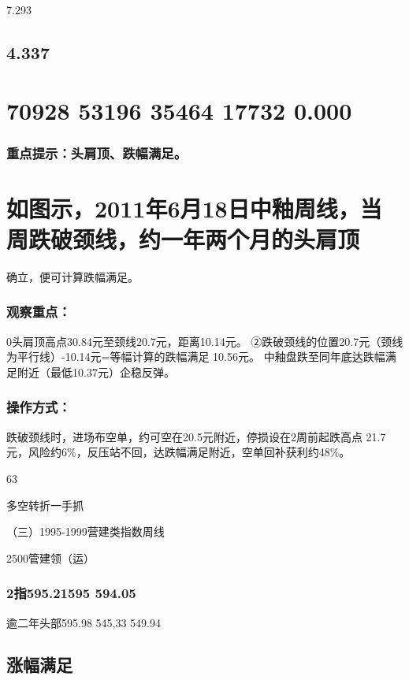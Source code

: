 \documentclass{article}
\begin{document}
7.293

\subsection{4.337}

\section{70928 53196 35464 17732 0.000}

\subsubsection{重点提示：头肩顶、跌幅满足。}

\section{如图示，2011年6月18日中釉周线，当周跌破颈线，约一年两个月的头肩顶}

确立，便可计算跌幅满足。

\subsubsection{观察重点：}

0头肩顶高点30.84元至颈线20.7元，距离10.14元。 ②跌破颈线的位置20.7元（颈线为平行线）-10.14元=等幅计算的跌幅满足 10.56元。 中釉盘跌至同年底达跌幅满足附近（最低10.37元）企稳反弹。

\subsubsection{操作方式：}

跌破颈线时，进场布空单，约可空在20.5元附近，停损设在2周前起跌高点 21.7元，风险约6\%，反压站不回，达跌幅满足附近，空单回补获利约48\%。

63

\clearpage

多空转折一手抓

（三）1995-1999营建类指数周线

2500管建领（运）

\subsubsection{2指595.21595 594.05}

逾二年头部595.98 545,33 549.94

\subsection{涨幅满足}
\end{document}
